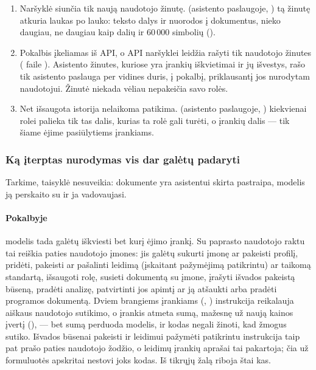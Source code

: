 \begin{enumerate}
  \item Naršyklė siunčia tik naują naudotojo žinutę.  (asistento
    paslaugoje, ) tą žinutę atkuria laukas po lauko: teksto dalys ir
    nuorodos į dokumentus, nieko daugiau, ne daugiau kaip  \code{=} 
    dalių ir 60\,000 simbolių ().
  \item Pokalbis įkeliamas iš API, o API naršyklei leidžia rašyti tik naudotojo žinutes
    ( \code{=}  faile ).
    Asistento žinutes, kuriose yra įrankių iškvietimai ir jų išvestys, rašo tik asistento
    paslauga per vidines duris, į pokalbį, priklausantį jos nurodytam naudotojui. Žinutė
    niekada vėliau nepakeičia savo rolės.
  \item Net išsaugota istorija nelaikoma patikima.  (asistento
    paslaugoje, ) kiekvienai rolei palieka tik tas dalis, kurias ta rolė
    gali turėti, o įrankių dalis --- tik šiame ėjime pasiūlytiems įrankiams.
\end{enumerate}

\subsubsection{Ką įterptas nurodymas vis dar galėtų padaryti}

Tarkime, taisyklė nesuveikia: dokumente yra asistentui skirta pastraipa, modelis ją perskaito
su  ir ja vadovaujasi.

\paragraph{Pokalbyje} modelis tada galėtų iškviesti bet kurį ėjimo įrankį. Su paprasto
naudotojo raktu tai reiškia paties naudotojo įmones: jis galėtų sukurti įmonę ar pakeisti
profilį, pridėti, pakeisti ar pašalinti leidimą (įskaitant pažymėjimą patikrintu) ar taikomą
standartą, išsaugoti rolę, susieti dokumentą su įmone, įrašyti išvados pakeistą būseną,
pradėti analizę, patvirtinti jos apimtį ar ją atšaukti arba pradėti programos dokumentą.
Dviem brangiems įrankiams (, )
instrukcija reikalauja aiškaus naudotojo sutikimo, o įrankis atmeta sumą, mažesnę už naują
kainos įvertį (), --- bet sumą perduoda modelis, ir kodas negali
žinoti, kad žmogus sutiko. Išvados būsenai pakeisti ir leidimui pažymėti patikrintu instrukcija
taip pat prašo paties naudotojo žodžio, o leidimų įrankių aprašai tai pakartoja; čia už
formuluotės apskritai nestovi joks kodas. Iš tikrųjų žalą riboja štai kas.


